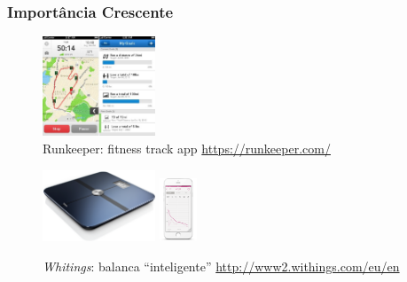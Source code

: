 \documentclass[hyperref={pdfpagelabels=true}]{beamer}
\begin{document}
\begin{frame}
\frametitle{Import\^{a}ncia Crescente}

      
    \begin{figure}   
         \includegraphics[width=0.3\textwidth]{runkeeper.jpg}
         \caption{Runkeeper: fitness track app \url{https://runkeeper.com/}}
    \end{figure} 
    
    \begin{figure}  
	\includegraphics[width=0.3\textwidth]{scale.png}
	\includegraphics[width=0.1\textwidth]{app.png}
         \caption{\textit{Whitings}: balanca ``inteligente'' \url{http://www2.withings.com/eu/en}}		
       \end{figure}  
    
    

\end{frame}

\end{document}
